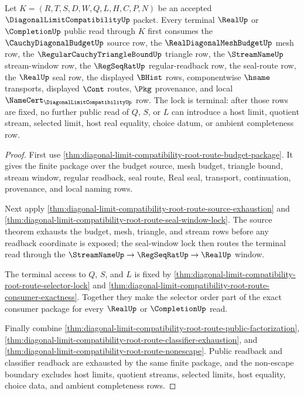 \begin{theorem}
\label{thm:diagonal-limit-compatibility-root-route-terminal-budget-lock}
Let $K=(R,T,S,D,W,Q,L,H,C,P,N)$ be an accepted $\DiagonalLimitCompatibilityUp$ packet. Every terminal $\RealUp$ or $\CompletionUp$ public read through $K$ first consumes the $\CauchyDiagonalBudgetUp$ source row, the $\RealDiagonalMeshBudgetUp$ mesh row, the $\RegularCauchyTriangleBoundUp$ triangle row, the $\StreamNameUp$ stream-window row, the $\RegSeqRatUp$ regular-readback row, the seal-route row, the $\RealUp$ seal row, the displayed $\BHist$ rows, componentwise $\hsame$ transports, displayed $\Cont$ routes, $\Pkg$ provenance, and local $\NameCert_{\DiagonalLimitCompatibilityUp}$ row. The lock is terminal: after those rows are fixed, no further public read of $Q$, $S$, or $L$ can introduce a host limit, quotient stream, selected limit, host real equality, choice datum, or ambient completeness row.
\end{theorem}
\begin{proof}
First use \autoref{thm:diagonal-limit-compatibility-root-route-budget-package}. It gives the finite package over the budget source, mesh budget, triangle bound, stream window, regular readback, seal route, Real seal, transport, continuation, provenance, and local naming rows.

Next apply \autoref{thm:diagonal-limit-compatibility-root-route-source-exhaustion} and \autoref{thm:diagonal-limit-compatibility-root-route-seal-window-lock}. The source theorem exhausts the budget, mesh, triangle, and stream rows before any readback coordinate is exposed; the seal-window lock then routes the terminal read through the $\StreamNameUp \to \RegSeqRatUp \to \RealUp$ window.

The terminal access to $Q$, $S$, and $L$ is fixed by \autoref{thm:diagonal-limit-compatibility-root-route-selector-lock} and \autoref{thm:diagonal-limit-compatibility-root-route-consumer-exactness}. Together they make the selector order part of the exact consumer package for every $\RealUp$ or $\CompletionUp$ read.

Finally combine \autoref{thm:diagonal-limit-compatibility-root-route-public-factorization}, \autoref{thm:diagonal-limit-compatibility-root-route-classifier-exhaustion}, and \autoref{thm:diagonal-limit-compatibility-root-route-nonescape}. Public readback and classifier readback are exhausted by the same finite package, and the non-escape boundary excludes host limits, quotient streams, selected limits, host equality, choice data, and ambient completeness rows.
\end{proof}

